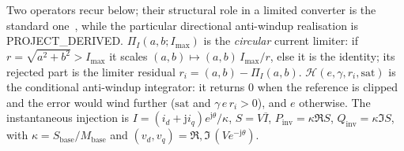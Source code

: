 \documentclass[12pt,a4paper]{article}
\theoremstyle{remark}
\begin{document}
Two operators recur below; their structural role in a limited converter is the
standard one~\cite{bacha2014}, while the particular directional anti-windup
realisation is \textsf{PROJECT\_DERIVED}. $\Pi_I(a,b;I_{\max})$ is the
\emph{circular} current
limiter: if $r=\sqrt{a^2+b^2}>I_{\max}$ it scales $(a,b)\mapsto(a,b)\,I_{\max}/r$,
else it is the identity; its rejected part is the limiter residual
$r_i=(a,b)-\Pi_I(a,b)$. $\mathcal{H}(e,\gamma,r_i,\text{sat})$ is the conditional
anti-windup integrator: it returns $0$ when the reference is clipped and the
error would wind further ($\text{sat}$ and $\gamma\,e\,r_i>0$), and $e$ otherwise.
The instantaneous injection is $I=(i_d+\mathrm{j}i_q)e^{\mathrm{j}\theta}/\kappa$,
$S=V\overline{I}$, $P_{\mathrm{inv}}=\kappa\Re S$, $Q_{\mathrm{inv}}=\kappa\Im S$,
with $\kappa=S_{\mathrm{base}}/M_{\mathrm{base}}$ and $(v_d,v_q)=\Re,\Im\,(Ve^{-\mathrm{j}\theta})$.
\end{document}
